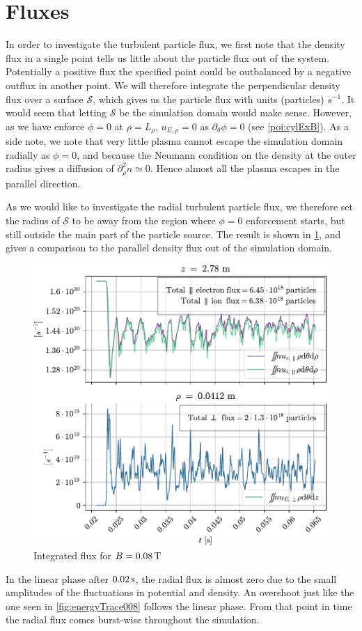 \section{Fluxes}
\label{sec:fluxes}
%
In order to investigate the turbulent particle flux, we first note that the density flux in a single point tells us little about the particle flux out of the system.
Potentially a positive flux the specified point could be outbalanced by a negative outflux in another point.
We will therefore integrate the perpendicular density flux over a surface $\mathcal{S}$, which gives us the particle flux with units (particles) $s^{-1}$.
It would seem that letting $\mathcal{S}$ be the simulation domain would make sense.
However, as we have enforce $\phi=0$ at $\rho=L_\rho$, $u_{E,\rho}=0$ as $\partial_\theta \phi=0$ (see \cref{poi:cylExB}).
As a side note, we note that very little plasma cannot escape the simulation domain radially as $\phi=0$, and because the Neumann condition on the density at the outer radius gives a diffusion of $\partial_\rho^2 n \simeq 0$.
Hence almost all the plasma escapes in the parallel direction.

As we would like to investigate the radial turbulent particle flux, we therefore set the radius of $\mathcal{S}$ to be away from the region where $\phi=0$ enforcement starts, but still outside the main part of the particle source.
The result is shown in \cref{fig:flux0008}, and gives a comparison to the parallel density flux out of the simulation domain.
%
\begin{figure}[htb]
    \centering
    \includegraphics{fig/results/totalFlux/flux0008}
    \caption{Integrated flux for $B=0.08\, \text{T}$}
    \label{fig:flux0008}
\end{figure}
%
In the linear phase after $0.02\, \text{s}$, the radial flux is almost zero due to the small amplitudes of the fluctuations in potential and density.
An overshoot just like the one seen in \cref{fig:energyTrace008} follows the linear phase.
From that point in time the radial flux comes burst-wise throughout the simulation.

